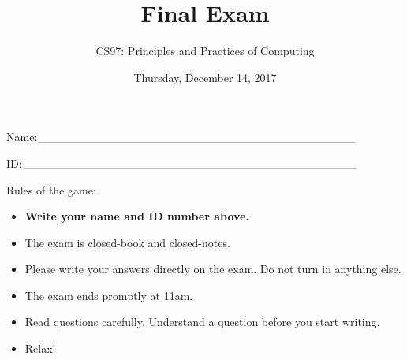 \documentclass[11pt]{article}
\title{Final Exam}
\author{CS97: Principles and Practices of Computing}
\date{Thursday, December 14, 2017}
\begin{document}
  
\maketitle
\thispagestyle{empty}
\pagestyle{empty}

  \begin{flushright}
\end{flushright}

\vspace{.5in}

Name:$\underline{\mbox{\hspace{4in}}}$

\vspace{.5in}

ID:$\underline{\mbox{\hspace{4.2in}}}$

\vspace{0.5in}

Rules of the game:

\begin{itemize}
  \item {\bf Write your name and ID number above.}
\item The exam is closed-book and closed-notes.

\item Please write your answers
directly on the exam.  Do not turn in anything else.



  
\item The exam ends promptly at 11am.
  
\item Read questions carefully.  Understand a question before you
  start writing. %

\item Relax!
\end{itemize}
\end{document}
